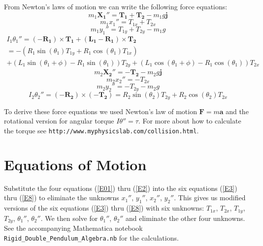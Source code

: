\documentclass[draft]{article}
\begin{document}
From Newton's laws of motion we can write the following force equations:
\[
m_1 \mathbf{X_1}'' = \mathbf{T_1} + \mathbf{T_2} - m_1 g \mathbf{j}
\]
\begin{equation}\label{E3}
m_1 x_1'' = T_{1x} + T_{2x}
\end{equation}
\begin{equation}\label{E4}
m_1 y_1'' = T_{1y} + T_{2y} - m_1 g
\end{equation}
\begin{multline}\label{E5}
  I_1 \theta_1'' = (-\mathbf{R_1}) \times \mathbf{T_1} + (\mathbf{L_1 - R_1}) \times \mathbf{T_2} \\
  = -(R_1 \sin(\theta_1) T_{1y} + R_1 \cos(\theta_1) T_{1x}) \\
  + (L_1 \sin(\theta_1+\phi)- R_1 \sin(\theta_1))  T_{2y} 
  + (L_1 \cos(\theta_1+\phi) - R_1 \cos(\theta_1)) T_{2x}
\end{multline}
\[
m_2 \mathbf{X_2}'' = -\mathbf{T_2} - m_2 g \mathbf{j}
\]
\begin{equation}\label{E6}
m_2 x_2'' = -T_{2x}
\end{equation}
\begin{equation}\label{E7}
m_2 y_2'' = -T_{2y} - m_2 g
\end{equation}
\begin{equation}\label{E8}
  I_2 \theta_2'' = (-\mathbf{R_2}) \times (-\mathbf{T_2}) 
  = R_2 \sin(\theta_2) T_{2y} + R_2 \cos(\theta_2) T_{2x}
\end{equation}

To derive these force equations we used Newton's law of motion $\mathbf{F} = m \mathbf{a}$ and the rotational version for angular torque $I \theta'' = \tau$.  For more about how to calculate the torque see \texttt{http://www.myphysicslab.com/collision.html}.

\section{Equations of Motion}

Substitute the four equations (\ref{E01}) thru (\ref{E2}) into the six equations (\ref{E3}) thru (\ref{E8}) to eliminate the unknowns $x_1''$, $y_1''$, $x_2''$, $y_2''$.  This gives us modified versions of the six equations (\ref{E3}) thru (\ref{E8}) with  six unknowns: $T_{1x}$, $T_{2x}$,  $T_{1y}$, $T_{2y}$, $\theta_1''$,  $\theta_2''$.  We then solve for $\theta_1''$, $\theta_2''$ and eliminate the other four unknowns.  See the accompanying Mathematica notebook \texttt{Rigid\_Double\_Pendulum\_Algebra.nb} for the calculations.
\end{document}
